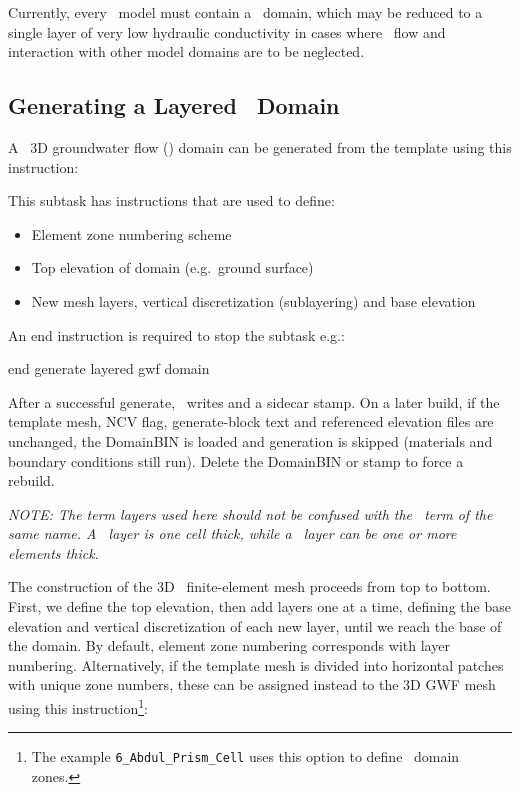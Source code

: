 \label{texfile:GWF}
Currently, every \mfus\ model must contain a \gwf\ domain, which may be reduced to a single layer of very low hydraulic conductivity in cases where \gwf\ flow and interaction with other model domains are to be neglected.

\subsection{Generating a Layered \gwf\ Domain}
A \mfus\ 3D groundwater flow (\gwf) domain can be generated from the template using this instruction:

    {This subtask has instructions that are used to define:
     \begin{itemize}
        \item Element zone numbering scheme
        \item Top elevation of domain (e.g.\ ground surface)
        \item New mesh layers, vertical discretization (sublayering) and base elevation
    \end{itemize}

    An end instruction is required to stop the subtask e.g.:

    {\Large \sf end generate layered gwf domain}

    After a successful generate, \mut\ writes  and a sidecar  stamp. On a later build, if the template mesh, NCV flag, generate-block text and referenced elevation files are unchanged, the DomainBIN is loaded and generation is skipped (materials and boundary conditions still run). Delete the DomainBIN or stamp to force a rebuild.
    }

    {\em NOTE: The term layers used here should not be confused with the \mf\ term of the same name. A \mf\ layer is one cell thick, while a \mut\ layer can be one or more elements thick.}

The construction of the 3D \gwf\ finite-element mesh proceeds from top to bottom.  First, we define the top elevation, then add layers one at a time, defining the base elevation and vertical discretization of each new layer,  until we reach the base of the domain. By default, element zone numbering  corresponds with layer numbering.  Alternatively, if the template mesh is divided into horizontal patches with unique zone numbers, these can be assigned instead to the 3D GWF mesh using this instruction\footnote{The example \texttt{6\_Abdul\_Prism\_Cell} uses this option to define \swf\ domain zones.}:

